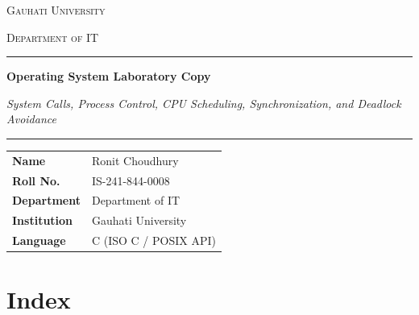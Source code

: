 \documentclass[11pt,a4paper]{article}
\begin{document}
\begin{titlepage}
    \thispagestyle{empty}
    \centering
    \vspace*{1.6cm}

    {\small\scshape\color{muted} Gauhati University \par}
    \vspace{0.25cm}
    {\normalsize\scshape\color{ink} Department of IT \par}

    \vspace{1.2cm}
    {\color{rulegray}\rule{0.45\textwidth}{0.6pt}\par}
    \vspace{1.2cm}

    {\LARGE\bfseries\color{ink} Operating System Laboratory Copy \par}
    \vspace{0.45cm}
    {\normalsize\itshape\color{muted}
        System Calls, Process Control, CPU Scheduling, Synchronization, and Deadlock Avoidance
    \par}

    \vspace{1.2cm}
    {\color{rulegray}\rule{0.45\textwidth}{0.6pt}\par}

    \vfill

    \begin{tabular}{@{}ll@{}}
        \toprule
        \textbf{Name}        & Ronit Choudhury \\
        \textbf{Roll No.}    & IS-241-844-0008 \\
        \textbf{Department}  & Department of IT \\
        \textbf{Institution} & Gauhati University \\
        \textbf{Language}    & C (ISO C / POSIX API) \\
        \bottomrule
    \end{tabular}

    \vspace{1.8cm}
\end{titlepage}

\newpage
\thispagestyle{plain}
\section*{Index}
\vspace{0.2cm}
\end{document}
